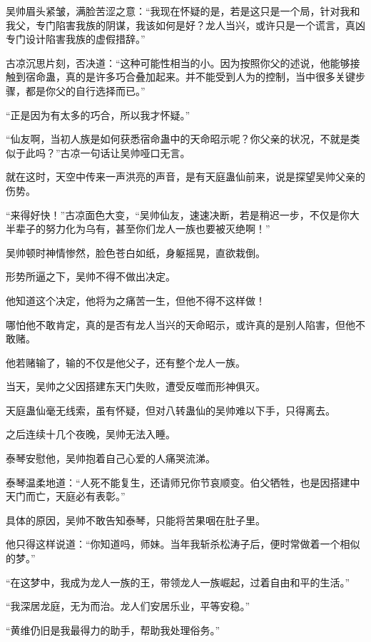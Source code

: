 
\begin{this_body}

吴帅眉头紧皱，满脸苦涩之意：“我现在怀疑的是，若是这只是一个局，针对我和我父，专门陷害我族的阴谋，我该如何是好？龙人当兴，或许只是一个谎言，真凶专门设计陷害我族的虚假措辞。”

古凉沉思片刻，否决道：“这种可能性相当的小。因为按照你父的述说，他能够接触到宿命蛊，真的是许多巧合叠加起来。并不能受到人为的控制，当中很多关键步骤，都是你父的自行选择而已。”

“正是因为有太多的巧合，所以我才怀疑。”

“仙友啊，当初人族是如何获悉宿命蛊中的天命昭示呢？你父亲的状况，不就是类似于此吗？”古凉一句话让吴帅哑口无言。

就在这时，天空中传来一声洪亮的声音，是有天庭蛊仙前来，说是探望吴帅父亲的伤势。

“来得好快！”古凉面色大变，“吴帅仙友，速速决断，若是稍迟一步，不仅是你大半辈子的努力化为乌有，甚至你们龙人一族也要被灭绝啊！”

吴帅顿时神情惨然，脸色苍白如纸，身躯摇晃，直欲栽倒。

形势所逼之下，吴帅不得不做出决定。

他知道这个决定，他将为之痛苦一生，但他不得不这样做！

哪怕他不敢肯定，真的是否有龙人当兴的天命昭示，或许真的是别人陷害，但他不敢赌。

他若赌输了，输的不仅是他父子，还有整个龙人一族。

当天，吴帅之父因搭建东天门失败，遭受反噬而形神俱灭。

天庭蛊仙毫无线索，虽有怀疑，但对八转蛊仙的吴帅难以下手，只得离去。

之后连续十几个夜晚，吴帅无法入睡。

泰琴安慰他，吴帅抱着自己心爱的人痛哭流涕。

泰琴温柔地道：“人死不能复生，还请师兄你节哀顺变。伯父牺牲，也是因搭建中天门而亡，天庭必有表彰。”

具体的原因，吴帅不敢告知泰琴，只能将苦果咽在肚子里。

他只得这样说道：“你知道吗，师妹。当年我斩杀松涛子后，便时常做着一个相似的梦。”

“在这梦中，我成为龙人一族的王，带领龙人一族崛起，过着自由和平的生活。”

“我深居龙庭，无为而治。龙人们安居乐业，平等安稳。”

“黄维仍旧是我最得力的助手，帮助我处理俗务。”


\end{this_body}

